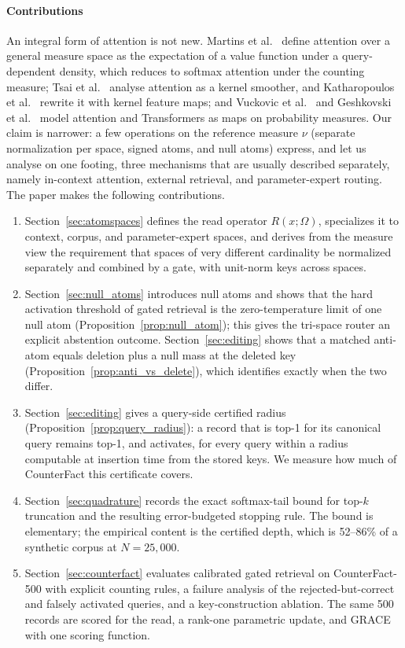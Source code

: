 \documentclass[preprint,12pt]{elsarticle}
\newcommand{\Om}{\Omega}
\newif\ifmarkchanges
\newcommand{\rev}[1]{\ifmarkchanges{\color{blue}#1}\else#1\fi}
\begin{document}
\paragraph{Contributions}
\rev{An integral form of attention is not new. Martins et al.~\cite{martins2020sparse} define attention over a general measure space as the expectation of a value function under a query-dependent density, which reduces to softmax attention under the counting measure; Tsai et al.~\cite{tsai2019transformer} analyse attention as a kernel smoother, and Katharopoulos et al.~\cite{katharopoulos2020transformers} rewrite it with kernel feature maps; and Vuckovic et al.~\cite{vuckovic2020mathematical} and Geshkovski et al.~\cite{geshkovski2025mathematical} model attention and Transformers as maps on probability measures. Our claim is narrower: a few operations on the reference measure $\nu$ (separate normalization per space, signed atoms, and null atoms) express, and let us analyse on one footing, three mechanisms that are usually described separately, namely in-context attention, external retrieval, and parameter-expert routing.} The paper makes the following contributions.
\begin{enumerate}[leftmargin=*,label=(\roman*)]
\item Section~\ref{sec:atomspaces} defines the read operator $R(x;\Om)$, specializes it to context, corpus, and parameter-expert spaces, and derives from the measure view the requirement that spaces of very different cardinality be normalized separately and combined by a gate, with unit-norm keys across spaces.
\item \rev{Section~\ref{sec:null_atoms} introduces null atoms and shows that the hard activation threshold of gated retrieval is the zero-temperature limit of one null atom (Proposition~\ref{prop:null_atom}); this gives the tri-space router an explicit abstention outcome. Section~\ref{sec:editing} shows that a matched anti-atom equals deletion plus a null mass at the deleted key (Proposition~\ref{prop:anti_vs_delete}), which identifies exactly when the two differ.}
\item \rev{Section~\ref{sec:editing} gives a query-side certified radius (Proposition~\ref{prop:query_radius}): a record that is top-1 for its canonical query remains top-1, and activates, for every query within a radius computable at insertion time from the stored keys. We measure how much of CounterFact this certificate covers.}
\item Section~\ref{sec:quadrature} records the exact softmax-tail bound for top-$k$ truncation and the resulting error-budgeted stopping rule. \rev{The bound is elementary; the empirical content is the certified depth, which is 52--86\% of a synthetic corpus at $N=25{,}000$.}
\item Section~\ref{sec:counterfact} evaluates calibrated gated retrieval on CounterFact-500 with explicit counting rules, \rev{a failure analysis of the rejected-but-correct and falsely activated queries, and a key-construction ablation}. The same 500 records are scored for the read, a rank-one parametric update, and GRACE \cite{hartvigsen2023aging} \rev{with one scoring function}.
\end{enumerate}
\end{document}
